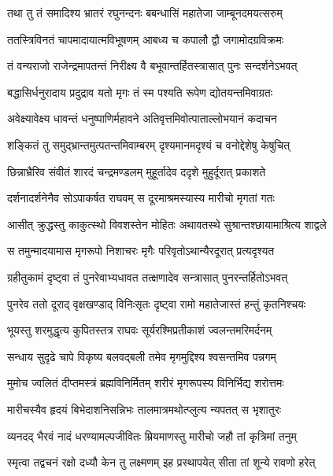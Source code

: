
\twolineshloka
{तथा तु तं समादिश्य भ्रातरं रघुनन्दनः}
{बबन्धासिं महातेजा जाम्बूनदमयत्सरुम्} %

\twolineshloka
{ततस्त्रिविनतं चापमादायात्मविभूषणम्}
{आबध्य च कपालौ द्वौ जगामोदग्रविक्रमः} %

\twolineshloka
{तं वन्यराजो राजेन्द्रमापतन्तं निरीक्ष्य वै}
{बभूवान्तर्हितस्त्रासात् पुनः सन्दर्शनेऽभवत्} %

\twolineshloka
{बद्धासिर्धनुरादाय प्रदुद्राव यतो मृगः}
{तं स्म पश्यति रूपेण द्योतयन्तमिवाग्रतः} %

\twolineshloka
{अवेक्ष्यावेक्ष्य धावन्तं धनुष्पाणिर्महावने}
{अतिवृत्तमिवोत्पाताल्लोभयानं कदाचन} %

\twolineshloka
{शङ्कितं तु समुद्भ्रान्तमुत्पतन्तमिवाम्बरम्}
{दृश्यमानमदृश्यं च वनोद्देशेषु केषुचित्} %

\twolineshloka
{छिन्नाभ्रैरिव संवीतं शारदं चन्द्रमण्डलम्}
{मुहूर्तादेव ददृशे मुहुर्दूरात् प्रकाशते} %

\twolineshloka
{दर्शनादर्शनेनैव सोऽपाकर्षत राघवम्}
{स दूरमाश्रमस्यास्य मारीचो मृगतां गतः} %

\twolineshloka
{आसीत् क्रुद्धस्तु काकुत्स्थो विवशस्तेन मोहितः}
{अथावतस्थे सुश्रान्तश्छायामाश्रित्य शाद्वले} %

\twolineshloka
{स तमुन्मादयामास मृगरूपो निशाचरः}
{मृगैः परिवृतोऽथान्यैरदूरात् प्रत्यदृश्यत} %

\twolineshloka
{ग्रहीतुकामं दृष्ट्वा तं पुनरेवाभ्यधावत}
{तत्क्षणादेव सन्त्रासात् पुनरन्तर्हितोऽभवत्} %

\twolineshloka
{पुनरेव ततो दूराद् वृक्षखण्डाद् विनिःसृतः}
{दृष्ट्वा रामो महातेजास्तं हन्तुं कृतनिश्चयः} %

\twolineshloka
{भूयस्तु शरमुद्धृत्य कुपितस्तत्र राघवः}
{सूर्यरश्मिप्रतीकाशं ज्वलन्तमरिमर्दनम्} %

\twolineshloka
{सन्धाय सुदृढे चापे विकृष्य बलवद्बली}
{तमेव मृगमुद्दिश्य श्वसन्तमिव पन्नगम्} %

\twolineshloka
{मुमोच ज्वलितं दीप्तमस्त्रं ब्रह्मविनिर्मितम्}
{शरीरं मृगरूपस्य विनिर्भिद्य शरोत्तमः} %

\twolineshloka
{मारीचस्यैव हृदयं बिभेदाशनिसन्निभः}
{तालमात्रमथोत्प्लुत्य न्यपतत् स भृशातुरः} %

\twolineshloka
{व्यनदद् भैरवं नादं धरण्यामल्पजीवितः}
{म्रियमाणस्तु मारीचो जहौ तां कृत्रिमां तनुम्} %

\twolineshloka
{स्मृत्वा तद्वचनं रक्षो दध्यौ केन तु लक्ष्मणम्}
{इह प्रस्थापयेत् सीता तां शून्ये रावणो हरेत्} %

